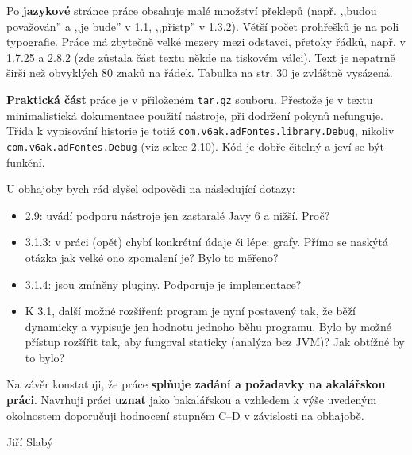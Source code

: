 \documentclass{article}
\begin{document}
Po \textbf{jazykové} stránce práce obsahuje malé množství překlepů (např.
,,budou považován'' a ,,je bude'' v 1.1, ,,přistp'' v 1.3.2). Větší počet
prohřešků je na poli typografie. Práce má zbytečně velké mezery mezi odstavci,
přetoky řádků, např. v 1.7.25 a 2.8.2 (zde zůstala část textu někde na
tiskovém válci). Text je nepatrně širší než obvyklých 80 znaků na řádek.
Tabulka na str. 30 je zvláštně vysázená.

\textbf{Praktická část} práce je v přiloženém \texttt{tar.gz} souboru.
Přestože je v textu minimalistická dokumentace použití nástroje, při dodržení
pokynů nefunguje. Třída k vypisování historie je totiž
\texttt{com.v6ak.adFontes.library.Debug}, nikoliv
\texttt{com.v6ak.adFontes.Debug} (viz sekce 2.10).  Kód je dobře čitelný a
jeví se být funkční.

U obhajoby bych rád slyšel odpovědi na následující dotazy:
\begin{itemize}
\item 2.9: uvádí podporu nástroje jen zastaralé Javy 6 a nižší. Proč?
\item 3.1.3: v práci (opět) chybí konkrétní údaje či lépe: grafy. Přímo se
naskýtá otázka jak velké ono zpomalení je? Bylo to měřeno?
\item 3.1.4: jsou zmíněny pluginy. Podporuje je implementace?
\item K 3.1, další možné rozšíření: program je nyní postavený tak, že běží
dynamicky a vypisuje jen hodnotu jednoho běhu programu. Bylo by možné přístup
rozšířit tak, aby fungoval staticky (analýza bez JVM)? Jak obtížné by to bylo?
\end{itemize}

Na závěr konstatuji, že práce \textbf{splňuje zadání a požadavky na
akalářskou práci}. Navrhuji práci \textbf{uznat} jako bakalářskou a vzhledem
k výše uvedeným okolnostem doporučuji hodnocení stupněm C--D v závislosti na
obhajobě.

\vspace{3em}
\begin{flushright}
Jiří Slabý
\end{flushright}
\end{document}
